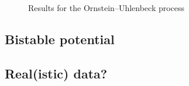 \documentclass[10pt]{article}
\begin{document}
\begin{figure}
\begin{tabular}{cc}
	\end{tabular}
	\caption{Results for the Ornstein--Uhlenbeck process}
	\label{fig:A_OU}
\end{figure}

\subsection{Bistable potential}

\subsection{Real(istic) data?}



\end{document}
